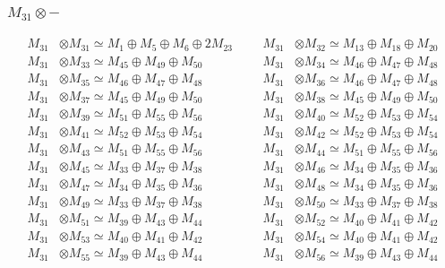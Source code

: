 \subsubsection{$ M_{31}\otimes -$}
\begin{align*}
M_{31} &\otimes M_{31} \simeq M_{1} \oplus M_{5} \oplus M_{6} \oplus 2M_{23} &&& M_{31} &\otimes M_{32} \simeq M_{13} \oplus M_{18} \oplus M_{20}\\
M_{31} &\otimes M_{33} \simeq M_{45} \oplus M_{49} \oplus M_{50} &&& M_{31} &\otimes M_{34} \simeq M_{46} \oplus M_{47} \oplus M_{48}\\
M_{31} &\otimes M_{35} \simeq M_{46} \oplus M_{47} \oplus M_{48} &&& M_{31} &\otimes M_{36} \simeq M_{46} \oplus M_{47} \oplus M_{48}\\
M_{31} &\otimes M_{37} \simeq M_{45} \oplus M_{49} \oplus M_{50} &&& M_{31} &\otimes M_{38} \simeq M_{45} \oplus M_{49} \oplus M_{50}\\
M_{31} &\otimes M_{39} \simeq M_{51} \oplus M_{55} \oplus M_{56} &&& M_{31} &\otimes M_{40} \simeq M_{52} \oplus M_{53} \oplus M_{54}\\
M_{31} &\otimes M_{41} \simeq M_{52} \oplus M_{53} \oplus M_{54} &&& M_{31} &\otimes M_{42} \simeq M_{52} \oplus M_{53} \oplus M_{54}\\
M_{31} &\otimes M_{43} \simeq M_{51} \oplus M_{55} \oplus M_{56} &&& M_{31} &\otimes M_{44} \simeq M_{51} \oplus M_{55} \oplus M_{56}\\
M_{31} &\otimes M_{45} \simeq M_{33} \oplus M_{37} \oplus M_{38} &&& M_{31} &\otimes M_{46} \simeq M_{34} \oplus M_{35} \oplus M_{36}\\
M_{31} &\otimes M_{47} \simeq M_{34} \oplus M_{35} \oplus M_{36} &&& M_{31} &\otimes M_{48} \simeq M_{34} \oplus M_{35} \oplus M_{36}\\
M_{31} &\otimes M_{49} \simeq M_{33} \oplus M_{37} \oplus M_{38} &&& M_{31} &\otimes M_{50} \simeq M_{33} \oplus M_{37} \oplus M_{38}\\
M_{31} &\otimes M_{51} \simeq M_{39} \oplus M_{43} \oplus M_{44} &&& M_{31} &\otimes M_{52} \simeq M_{40} \oplus M_{41} \oplus M_{42}\\
M_{31} &\otimes M_{53} \simeq M_{40} \oplus M_{41} \oplus M_{42} &&& M_{31} &\otimes M_{54} \simeq M_{40} \oplus M_{41} \oplus M_{42}\\
M_{31} &\otimes M_{55} \simeq M_{39} \oplus M_{43} \oplus M_{44} &&& M_{31} &\otimes M_{56} \simeq M_{39} \oplus M_{43} \oplus M_{44}\\
\end{align*}

